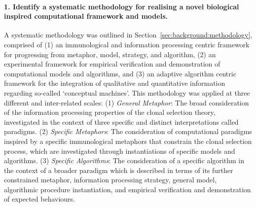 \paragraph{1. Identify a systematic methodology for realising a novel biological inspired computational framework and models.}
A systematic methodology was outlined in Section~\ref{sec:background:methodology}, comprised of (1) an immunological and information processing centric framework for progressing from metaphor, model, strategy, and algorithm, (2) an experimental framework for empirical verification and demonstration of computational models and algorithms, and (3) an adaptive algorithm centric framework for the integration of qualitative and quantitative information regarding so-called `conceptual machines'.
This methodology was applied at three different and inter-related scales: (1) \emph{General Metaphor}: The broad consideration of the information processing properties of the clonal selection theory, investigated in the context of three specific and distinct interpretations called paradigms. (2) \emph{Specific Metaphors}: The consideration of computational paradigms inspired by a specific immunological metaphors that constrain the clonal selection process, which are investigated through instantiations of specific models and algorithms. (3) \emph{Specific Algorithms}: The consideration of a specific algorithm in the context of a broader paradigm which is described in terms of its further constrained metaphor, information processing strategy, general model, algorithmic procedure instantiation, and empirical verification and demonstration of expected behaviours.

